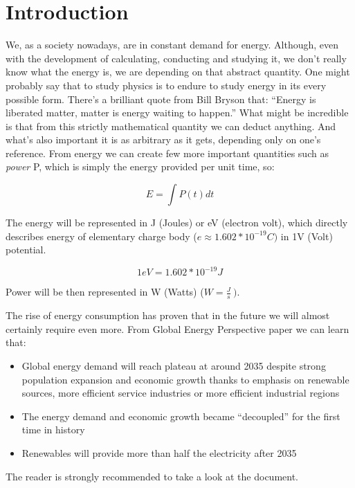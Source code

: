\chapter{Introduction}
We, as a society nowadays, are in constant demand for energy. Although,
even with the development of calculating, conducting and studying it, we
don't really know what the energy is, we are depending on that abstract
quantity. One might probably say that to study physics is to endure to
study energy in its every possible form. There's a brilliant quote from
Bill Bryson that: ``Energy is liberated matter, matter is energy waiting
to happen.'' What might be incredible is that from this strictly
mathematical quantity we can deduct anything. And what's also important
it is as arbitrary as it gets, depending only on one's reference. From
energy we can create few more important quantities such as \emph{power}
P, which is simply the energy provided per unit time, so:

$$E = \int P\left( t \right)dt$$

The energy will be represented in J (Joules) or eV (electron
volt), which directly describes energy of elementary charge body
(\(e \approx 1.602*10^{- 19}C)\) in 1V (Volt) potential.

$$1eV = 1.602*10^{- 19}J$$

Power will be then represented in W (Watts) (\(W = \frac{J}{s}\ ).\)

The rise of energy consumption has proven that in the future we will
almost certainly require even more. From Global Energy Perspective paper 
\cite{Insights2019} we can learn that:

\begin{itemize}
\item
  Global energy demand will reach plateau at around 2035 despite strong
  population expansion and economic growth thanks to emphasis on
  renewable sources, more efficient service industries or more efficient
  industrial regions

\item
  The energy demand and economic growth became ``decoupled'' for the
  first time in history

\item
  Renewables will provide more than half the electricity after 2035

\end{itemize}

The reader is strongly recommended to take a look at the document.

